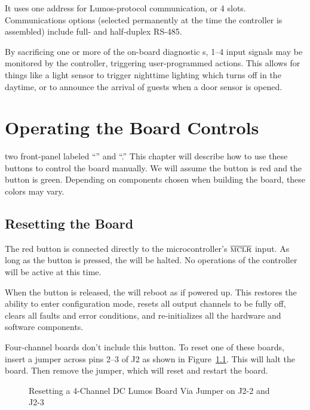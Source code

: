 \documentclass[letterpaper,twoside,onecolumn,openright,final]{memoir}
\begin{document}
It uses one address for Lumos-protocol communication, or 4  slots.
Communications options (selected permanently at the time the controller is assembled) include
full- and half-duplex RS-485.

By sacrificing one or more of the on-board diagnostic s, 1--4 input signals may be 
monitored by the controller, triggering user-programmed actions.  This allows for things like
a light sensor to trigger nighttime lighting which turns off in the daytime, or to announce the
arrival of guests when a door sensor is opened.


\chapter{Operating the Board Controls}
 two front-panel  labeled ``'' and ``.''
This chapter will describe how to use these buttons to control the board manually.  We will assume the
 button is red and the  button is green.  Depending on components chosen when building the
board, these colors may vary.

\section{Resetting the Board}
The red  button is connected directly to the microcontroller's $\overline{\hbox{\mc{MCLR}}}$ input.
As long as the button is pressed, the  will be halted.  No operations of the controller
will be active at this time.  

When the button is released, the  will reboot as if powered up.  This restores the ability
to enter configuration mode, resets all output channels to be fully off, 
clears all faults and error conditions, and re-initializes all the hardware
and software components.

Four-channel boards don't include this button.  To reset one of these boards, insert a jumper across pins 
2--3 of J2 as shown in Figure~\ref{fig:4dc-reset}.  This will halt the board.  Then remove the jumper,
which will reset and restart the board.
\begin{figure}
  \caption{Resetting a 4-Channel DC Lumos Board Via Jumper on J2-2 and J2-3\label{fig:4dc-reset}}
\end{figure}
\end{document}

